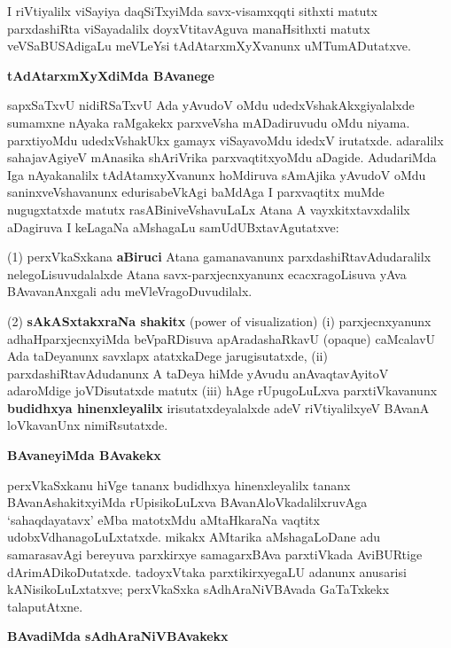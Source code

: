 I riVtiyalilx viSayiya daqSiTxyiMda savx-visamxqqti sithxti matutx parxdashiRta viSayadalilx doyxVtitavAguva manaHsithxti matutx veVSaBUSAdigaLu meVLeYsi tAdAtarxmXyXvanunx uMTumADutatxve.

\newpage

\begin{center}
{\Large\bf tAdAtarxmXyXdiMda BAvanege}
\end{center}

sapxSaTxvU nidiRSaTxvU Ada yAvudoV oMdu udedxVshakAkxgiyalalxde sumamxne nAyaka raMgakekx parxveVsha mADadiruvudu oMdu niyama. parxtiyoMdu udedxVshakUkx gamayx viSayavoMdu idedxV irutatxde. adaralilx sahajavAgiyeV mAnasika shAriVrika parxvaqtitxyoMdu aDagide. AdudariMda Iga nAyakanalilx tAdAtamxyXvanunx hoMdiruva sAmAjika yAvudoV oMdu saninxveVshavanunx edurisabeVkAgi baMdAga I parxvaqtitx muMde nugugxtatxde matutx rasABiniveVshavuLaLx Atana A vayxkitxtavxdalilx aDagiruva I keLagaNa aMshagaLu samUdUBxtavAgutatxve:

(1) perxVkaSxkana {\bf aBiruci} Atana gamanavanunx parxdashiRtavAdudaralilx nelegoLisuvu\-dalalxde Atana savx-parxjecnxyanunx ecacxragoLisuva yAva BAvavanAnxgali adu meVleVragoDuvudilalx.

(2) {\bf sAkASxtakxraNa shakitx} {\rm(power of visualization)} {\rm(i)} parxjecnxyanunx adhaHparxjecnxyiMda beVpaRDisuva apAradashaRkavU {\rm(opaque)} caMcalavU Ada taDeyanunx savxlapx atatxkaDege jarugisutatxde, {\rm(ii)} parxdashiRtavAdudanunx A taDeya hiMde yAvudu anAvaqtavAyitoV adaroMdige joVDisutatxde matutx {\rm(iii)} hAge rUpugoLuLxva parxtiVkavanunx {\bf budidhxya hinenxleyalilx} irisutatxdeyalalxde adeV riVtiyalilxyeV BAvanA loVkavanUnx nimiRsutatxde.

\smallskip
\begin{center}
{\Large\bf BAvaneyiMda BAvakekx}
\end{center}

perxVkaSxkanu hiVge tananx budidhxya hinenxleyalilx tananx BAvanAshakitxyiMda rUpisikoLuLxva BAvanAloVkadalilxruvAga `sahaqdayatavx' eMba matotxMdu aMtaHkaraNa vaqtitx udobxV\-dhanagoLuLxtatxde. mikakx AMtarika aMshagaLoDane adu samarasavAgi bereyuva parxkirxye samagarxBAva parxtiVkada AviBURtige dArimADikoDutatxde. tadoyxVtaka parxtikirxyegaLU adanunx anusarisi kANisikoLuLxtatxve; perxVkaSxka sAdhAraNiVBAvada GaTaTxkekx talaputAtxne.


\smallskip
\begin{center}
{\Large\bf BAvadiMda sAdhAraNiVBAvakekx}
\end{center}

